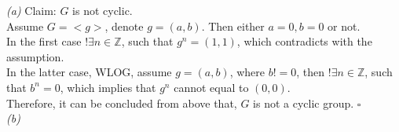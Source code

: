 \documentclass[11pt]{article}
\newenvironment{problem}[2][Problem]{\begin{trivlist}
\item[\hskip \labelsep {\bfseries #1}\hskip \labelsep {\bfseries #2.}]}{\end{trivlist}}
\begin{document}
\begin{problem}{5}
\textit{(a)} Claim: $G$ is not cyclic.\\
Assume $G = <g >$, denote $g = (a,b)$. Then either $a =0, b = 0$ or not.\\
In the first case $!\exists n \in \mathbb{Z}$, such that $g^n = (1,1)$, which contradicts with the assumption.\\
In the latter case, WLOG, assume $g = (a,b)$, where $b != 0$, then $!\exists n \in \mathbb{Z}$, such that $b^n = 0$, which implies that $g^n$ cannot equal to $(0,0)$.\\
Therefore, it can be concluded from above that, $G$ is not a cyclic group. $\square$\\
\textit{(b)}
\end{problem}
\end{document}
